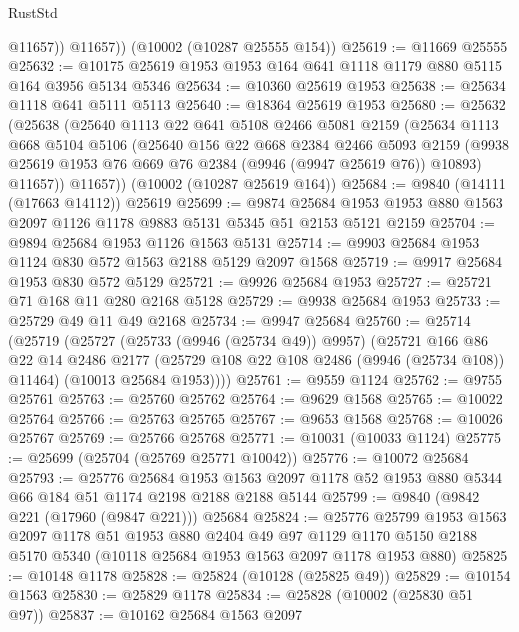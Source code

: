 \begin{lexlean}{RustStd}
\begin{coremodule}
            @11657))
        @11657))
    (@10002 (@10287 @25555 @154))
@25619 := @11669 @25555
@25632 := @10175 @25619 @1953 @1953 @164 @641 @1118 @1179 @880 @5115 @164 @3956 @5134 @5346
@25634 := @10360 @25619 @1953
@25638 := @25634 @1118 @641 @5111 @5113
@25640 := @18364 @25619 @1953
@25680 := @25632
    (@25638
      (@25640
        @1113
        @22
        @641
        @5108
        @2466
        @5081
        @2159
        (@25634
          @1113
          @668
          @5104
          @5106
          (@25640
            @156
            @22
            @668
            @2384
            @2466
            @5093
            @2159
            (@9938 @25619 @1953 @76 @669 @76 @2384 (@9946 (@9947 @25619 @76)) @10893)
            @11657))
        @11657))
    (@10002 (@10287 @25619 @164))
@25684 := @9840 (@14111 (@17663 @14112)) @25619
@25699 := @9874
    @25684
    @1953
    @1953
    @880
    @1563
    @2097
    @1126
    @1178
    @9883
    @5131
    @5345
    @51
    @2153
    @5121
    @2159
@25704 := @9894 @25684 @1953 @1126 @1563 @5131
@25714 := @9903 @25684 @1953 @1124 @830 @572 @1563 @2188 @5129 @2097 @1568
@25719 := @9917 @25684 @1953 @830 @572 @5129
@25721 := @9926 @25684 @1953
@25727 := @25721 @71 @168 @11 @280 @2168 @5128
@25729 := @9938 @25684 @1953
@25733 := @25729 @49 @11 @49 @2168
@25734 := @9947 @25684
@25760 := @25714
    (@25719
      (@25727
        (@25733 (@9946 (@25734 @49)) @9957)
        (@25721
          @166
          @86
          @22
          @14
          @2486
          @2177
          (@25729 @108 @22 @108 @2486 (@9946 (@25734 @108)) @11464)
          (@10013 @25684 @1953))))
@25761 := @9559 @1124
@25762 := @9755 @25761
@25763 := @25760 @25762
@25764 := @9629 @1568
@25765 := @10022 @25764
@25766 := @25763 @25765
@25767 := @9653 @1568
@25768 := @10026 @25767
@25769 := @25766 @25768
@25771 := @10031 (@10033 @1124)
@25775 := @25699 (@25704 (@25769 @25771 @10042))
@25776 := @10072 @25684
@25793 := @25776
    @25684
    @1953
    @1563
    @2097
    @1178
    @52
    @1953
    @880
    @5344
    @66
    @184
    @51
    @1174
    @2198
    @2188
    @2188
    @5144
@25799 := @9840 (@9842 @221 (@17960 (@9847 @221))) @25684
@25824 := @25776
    @25799
    @1953
    @1563
    @2097
    @1178
    @51
    @1953
    @880
    @2404
    @49
    @97
    @1129
    @1170
    @5150
    @2188
    @5170
    @5340
    (@10118 @25684 @1953 @1563 @2097 @1178 @1953 @880)
@25825 := @10148 @1178
@25828 := @25824 (@10128 (@25825 @49))
@25829 := @10154 @1563
@25830 := @25829 @1178
@25834 := @25828 (@10002 (@25830 @51 @97))
@25837 := @10162 @25684 @1563 @2097

\end{coremodule}
\end{lexlean}
